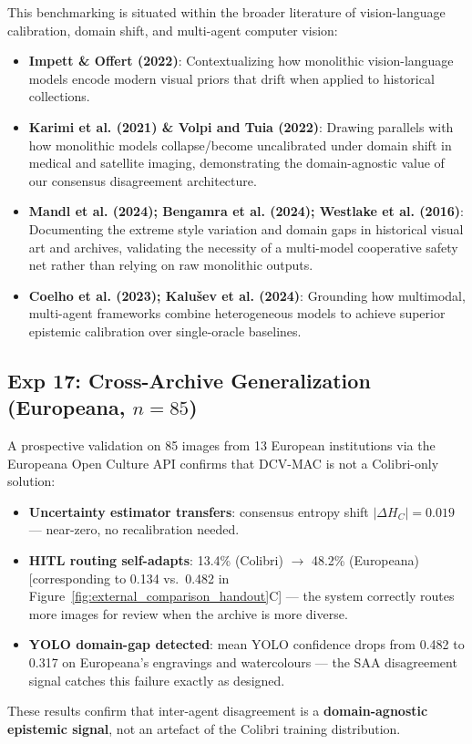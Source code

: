 \documentclass[11pt,a4paper]{article}
\newcommand{\term}[1]{\textbf{#1}}
\begin{document}
This benchmarking is situated within the broader literature of vision-language calibration, domain shift, and multi-agent computer vision:
\begin{itemize}[leftmargin=*, noitemsep]
    \item \term{Impett \& Offert (2022)}: Contextualizing how monolithic vision-language models encode modern visual priors that drift when applied to historical collections.
    \item \term{Karimi et al. (2021) \& Volpi and Tuia (2022)}: Drawing parallels with how monolithic models collapse/become uncalibrated under domain shift in medical and satellite imaging, demonstrating the domain-agnostic value of our consensus disagreement architecture.
    \item \term{Mandl et al. (2024); Bengamra et al. (2024); Westlake et al. (2016)}: Documenting the extreme style variation and domain gaps in historical visual art and archives, validating the necessity of a multi-model cooperative safety net rather than relying on raw monolithic outputs.
    \item \term{Coelho et al. (2023); Kalušev et al. (2024)}: Grounding how multimodal, multi-agent frameworks combine heterogeneous models to achieve superior epistemic calibration over single-oracle baselines.
\end{itemize}

\subsection{\texorpdfstring{Exp 17: Cross-Archive Generalization (Europeana, $n=85$)}{Exp 17: Cross-Archive Generalization (Europeana, n=85)}}
A prospective validation on 85 images from 13 European institutions via the Europeana Open Culture API confirms that DCV-MAC is not a Colibri-only solution:
\begin{itemize}[leftmargin=*, noitemsep]
    \item \term{Uncertainty estimator transfers}: consensus entropy shift $|\Delta H_C| = 0.019$ --- near-zero, no recalibration needed.
    \item \term{HITL routing self-adapts}: 13.4\% (Colibri) $\to$ 48.2\% (Europeana) [corresponding to 0.134 vs.\ 0.482 in Figure~\ref{fig:external_comparison_handout}C] --- the system correctly routes more images for review when the archive is more diverse.
    \item \term{YOLO domain-gap detected}: mean YOLO confidence drops from 0.482 to 0.317 on Europeana's engravings and watercolours --- the SAA disagreement signal catches this failure exactly as designed.
\end{itemize}
These results confirm that inter-agent disagreement is a \textbf{domain-agnostic epistemic signal}, not an artefact of the Colibri training distribution.
\end{document}
